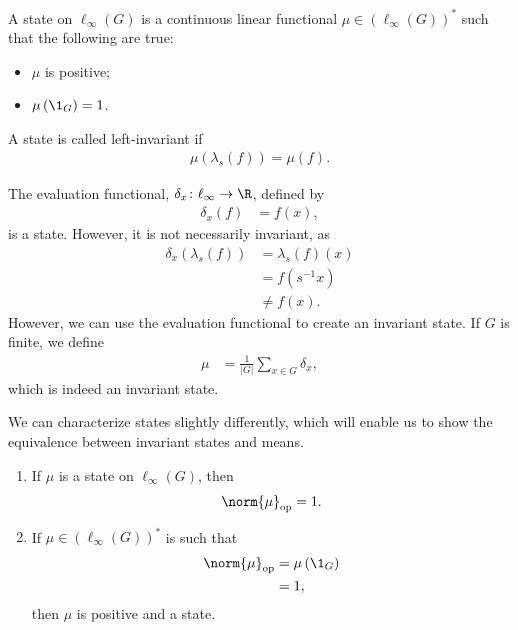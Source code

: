 \begin{definition}
  A {state} on $\ell_{\infty}\left(G\right)$ is a continuous linear functional $\mu\in \left(\ell_{\infty}\left(G\right)\right)^{\ast}$ such that the following are true:
  \begin{itemize}
    \item $\mu$ is positive;
    \item $\mu\left(\1_{G}\right) = 1$.
  \end{itemize}
  A state is called left-invariant if
  \begin{align*}
    \mu\left(\lambda_s\left(f\right)\right) = \mu\left(f\right).
  \end{align*}
\end{definition}
\begin{example}
  The evaluation functional, $\delta_x\colon \ell_{\infty}\rightarrow \R$, defined by
  \begin{align*}
    \delta_{x}\left(f\right) &= f(x),
  \end{align*}
  is a state. However, it is not necessarily invariant, as
  \begin{align*}
    \delta_x\left(\lambda_s\left(f\right)\right) &= \lambda_s\left(f\right)\left(x\right)\\
                                                 &= f\left(s^{-1}x\right)\\
                                                 &\neq f(x).
  \end{align*}
  However, we can use the evaluation functional to create an invariant state. If $G$ is finite, we define
  \begin{align*}
    \mu &= \frac{1}{\left\vert G \right\vert} \sum_{x\in G}\delta_x,
  \end{align*}
  which is indeed an invariant state.
\end{example}
We can characterize states slightly differently, which will enable us to show the equivalence between invariant states and means.
\begin{lemma}
  \begin{enumerate}[(1)]
    \item If $\mu$ is a state on $\ell_{\infty}\left(G\right)$, then
      \begin{align*}
        \norm{\mu}_{\text{op}} = 1.
      \end{align*}
    \item If $\mu\in \left(\ell_{\infty}\left(G\right)\right)^{\ast}$ is such that
      \begin{align*}
        \norm{\mu}_{\text{op}} &= \mu\left(\1_{G}\right)\\
                               &= 1,
      \end{align*}
      then $\mu$ is positive and a state.
  \end{enumerate}\label{lemma:characterizing_states}
\end{lemma}
